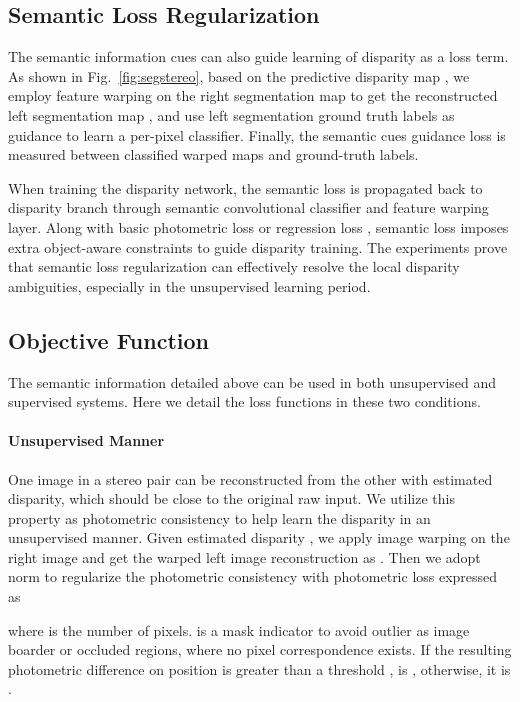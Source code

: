 \documentclass[runningheads]{llncs}
\begin{document}
\subsection{Semantic Loss Regularization}\label{subsec:method_loss_regularization}

The semantic information cues can also guide learning of disparity as a loss term. As shown in Fig.~\ref{fig:segstereo}, based on the predictive disparity map , we employ feature warping on the right segmentation map  to get the reconstructed left segmentation map , and use left segmentation ground truth labels as guidance to learn a per-pixel classifier. Finally, the semantic cues guidance loss  is measured between classified warped maps and ground-truth labels. 

When training the disparity network, the semantic loss  is propagated back to disparity branch through semantic convolutional classifier and feature warping layer. Along with basic photometric loss  or regression loss , semantic loss  imposes extra object-aware constraints to guide disparity training. The experiments prove that semantic loss regularization can effectively resolve the local disparity ambiguities, especially in the unsupervised learning period.

\subsection{Objective Function}
The semantic information detailed above can be used in both unsupervised and supervised systems. Here we detail the loss functions in these two conditions.

\paragraph{\textbf{Unsupervised Manner}}
One image in a stereo pair can be reconstructed from the other with estimated disparity, which should be close to the original raw input. We utilize this property as photometric consistency to help learn the disparity in an unsupervised manner. Given estimated disparity , we apply image warping  on the right image  and get the warped left image reconstruction as . Then we adopt  norm to regularize the photometric consistency with photometric loss  expressed as

where  is the number of pixels.  is a mask indicator to avoid outlier as image boarder or occluded regions, where no pixel correspondence exists. If the resulting photometric difference on position  is greater than a threshold ,  is , otherwise, it is .
\end{document}
